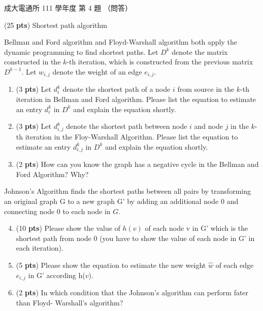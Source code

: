 \begin{pastexam}[label={px:ncku-111-cce-ds-04}]{成大電通所 111 學年度 第 4 題}
（問答）

(25 \textbf{pts}) Shortest path algorithm

Bellman and Ford algorithm and Floyd-Warshall algorithm both apply the dynamic programming to
find shortest paths. Let $D^k$ denote the matrix constructed in the $k$-th iteration, which is
constructed from the previous matrix $D^{k-1}$. Let $w_{i,j}$ denote the weight of an edge
$e_{i,j}$.
\begin{enumerate}[label=\alph*.]
\item (3 \textbf{pts}) Let $d_i^k$ denote the shortest path of a node $i$ from source in the
$k$-th iteration in Bellman and Ford algorithm. Please list the equation to estimate an entry
$d_i^k$ in $D^k$ and explain the equation shortly.
\item (3 \textbf{pts}) Let $d_{i,j}^k$ denote the shortest path between node $i$ and node $j$ in
the $k$-th iteration in the Floy-Warshall Algorithm. Please list the equation to estimate an
entry $d_{i,j}^k$ in $D^k$ and explain the equation shortly.
\item (2 \textbf{pts}) How can you know the graph has a negative cycle in the Bellman and Ford
Algorithm? Why?
\end{enumerate}

Johnson's Algorithm finds the shortest paths between all pairs by transforming an original graph
G to a new graph G' by adding an additional node 0 and connecting node 0 to each node in $G$.

\begin{center}
\end{center}
\begin{enumerate}[label=\alph*.]
\setcounter{enumi}{3}
\item (10 \textbf{pts}) Please show the value of $h(v)$ of each node v in G' which is the
shortest path from node 0 (you have to show the value of each node in G' in each iteration).
\item (5 \textbf{pts}) Please show the equation to estimate the new weight $\widehat{w}$ of each
edge $e_{i,j}$ in G' according h($v$).
\item (2 \textbf{pts}) In which condition that the Johnson's algorithm can perform fater than
Floyd- Warshall's algorithm?
\end{enumerate}
\end{pastexam}


